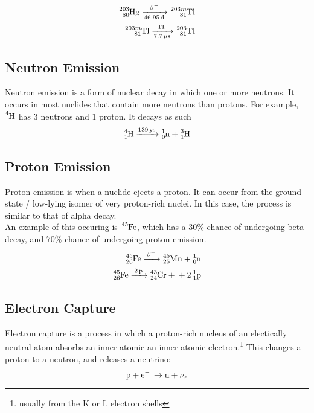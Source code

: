 \documentclass{article}
\begin{document}
\begin{multicols*}{2}
    \begin{equation*}
      \begin{split}
        \ce{^{203}_{80}Hg ->[\beta^{-}][46.95 d] ^{203m}_{81}Tl} \\
        \ce{^{203m}_{81}Tl ->[IT][7.7 \mu{s}] ^{203}_{81}Tl} \\
      \end{split}
    \end{equation*}
    \subsection{Neutron Emission}
    Neutron emission is a form of nuclear decay in which one or more neutrons.
    It occurs in most nuclides that contain more neutrons than protons. For
    example, $\ce{^{4}H}$ has $3$ neutrons and $1$ proton. It decays as such
    \[
      \ce{^{4}_{1}H ->[139 ys] ^{1}_{0}n + ^{3}_{1}H}
    \]
    
    \subsection{Proton Emission}
    Proton emission is when a nuclide ejects a proton. It can occur from
    the ground state / low-lying isomer of very proton-rich nuclei. In
    this case, the process is similar to that of alpha decay.\\

    An example of this occuring is $\ce{^{45}Fe}$, which has a $30\%$ chance
    of undergoing beta decay, and $70\%$ chance of undergoing proton emission.
    \begin{equation*}
      \begin{split}
        \ce{^{45}_{26}Fe ->[\beta^{+}] ^{45}_{25}Mn + ^{1}_{0}n} \\
        \ce{^{45}_{26}Fe ->[2p] ^{43}_{24}Cr + + 2 ^{1}_{1}p}
      \end{split}
    \end{equation*}

    \subsection{Electron Capture}
    Electron capture is a process in which a proton-rich nucleus of an electically
    neutral atom absorbs an inner atomic an inner atomic electron.\footnote{usually from the K or L electron shells}
    This changes a proton to a neutron, and releases a neutrino:
    \[
      \ce{p + e- \to n + \nu_e}
    \]


\end{multicols*}
\end{document}
